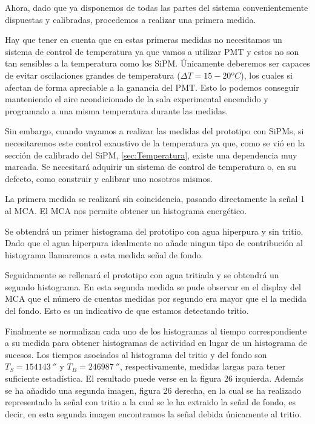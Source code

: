 Ahora, dado que ya disponemos de todas las partes del sistema convenientemente dispuestas y calibradas, procedemos a realizar una primera medida.

Hay que tener en cuenta que en estas primeras medidas no necesitamos un sistema de control de temperatura ya que vamos a utilizar PMT y estos no son tan sensibles a la temperatura como los SiPM. Únicamente deberemos ser capaces de evitar oscilaciones grandes de temperatura ($\Delta T=15-20ºC$), los cuales si afectan de forma apreciable a la ganancia del PMT. Esto lo podemos conseguir manteniendo el aire acondicionado de la sala experimental encendido y programado a una misma temperatura durante las medidas. 

Sin embargo, cuando vayamos a realizar las medidas del prototipo con SiPMs, si necesitaremos este control exaustivo de la temperatura ya que, como se vió en la sección de calibrado del SiPM, \ref{sec:Temperatura}, existe una dependencia muy marcada. Se necesitará adquirir un sistema de control de temperatura o, en su defecto, como construir y calibrar uno nosotros mismos.

La primera medida se realizará sin coincidencia, pasando directamente la señal 1 al MCA. El MCA nos permite obtener un histograma energético.

Se obtendrá un primer histograma del prototipo con agua hiperpura y sin tritio. Dado que el agua hiperpura idealmente no añade ningun tipo de contribución al histograma llamaremos a esta medida señal de fondo. 

Seguidamente se rellenará el prototipo con agua tritiada y se obtendrá un segundo histograma. En esta segunda medida se pude observar en el display del MCA que el número de cuentas medidas por segundo era mayor que el la medida del fondo. Esto es un indicativo de que estamos detectando tritio. 

Finalmente se normalizan cada uno de los histogramas al tiempo correspondiente a su medida para obtener histogramas de actividad en lugar de un histograma de sucesos. Los tiempos asociados al histograma del tritio y del fondo son $T_S=154143~\second$  y $T_B=246987~\second$, respectivamente, medidas largas para tener suficiente estadística. El resultado puede verse en la figura 26 izquierda. Además se ha añadido una segunda imagen, figura 26 derecha, en la cual se ha realizado representado la señal con tritio a la cual se le ha extraido la señal de fondo, es decir, en esta segunda imagen encontramos la señal debida únicamente al tritio.

